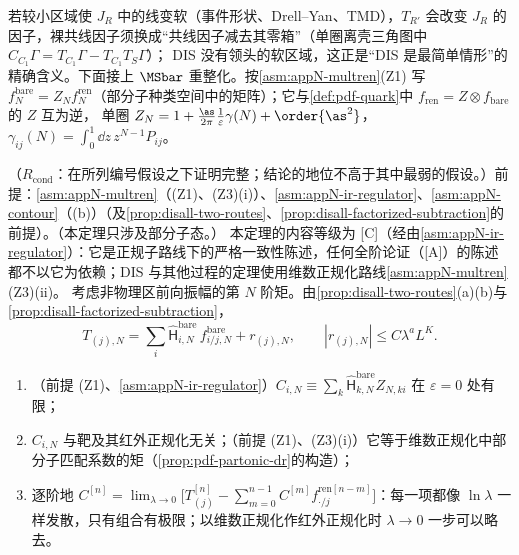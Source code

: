 \noindent
若较小区域使 $J_R$ 中的线变软（事件形状、Drell--Yan、TMD），$T_{R'}$ 会改变 $J_R$ 的因子，裸共线因子须换成“共线因子减去其零箱”（单圈离壳三角图中 $C_{C_1}\Gamma=T_{C_1}\Gamma-T_{C_1}T_S\Gamma$）；
DIS 没有领头的软区域，这正是“DIS 是最简单情形”的精确含义。下面接上 $\MSbar$ 重整化。按\cref{asm:appN-multren}(Z1) 写 $f^{\mathrm{bare}}_N=Z_Nf^{\mathrm{ren}}_N$（部分子种类空间中的矩阵）；它与\cref{def:pdf-quark}中 $f_{\mathrm{ren}}=Z\otimes f_{\mathrm{bare}}$ 的 $Z$ 互为逆，
单圈 $Z_N=1+\frac{\as}{2\pi}\frac1\varepsilon\gamma(N)+\order{\as^2}$，$\gamma_{ij}(N)=\int_0^1\dd z\,z^{N-1}P_{ij}$。

\begin{theorem}\label{thm:disall-renorm-compat}
（$R_{\mathrm{cond}}$：在所列编号假设之下证明完整；结论的地位不高于其中最弱的假设。）前提：\cref{asm:appN-multren}（(Z1)、(Z3)(i)）、\cref{asm:appN-ir-regulator}、\cref{asm:appN-contour}（(b)）（及\cref{prop:disall-two-routes}、\cref{prop:disall-factorized-subtraction}的前提）。（本定理只涉及部分子态。）
本定理的内容等级为 [C]（经由\cref{asm:appN-ir-regulator}）：它是正规子路线下的严格一致性陈述，任何全阶论证（[A]）的陈述都不以它为依赖；DIS 与其他过程的定理使用维数正规化路线\cref{asm:appN-multren}(Z3)(ii)。
考虑非物理区前向振幅的第 $N$ 阶矩。由\cref{prop:disall-two-routes}(a)(b)与\cref{prop:disall-factorized-subtraction}，
\begin{equation}\label{eq:disall-renorm-start}
T_{(j),N}=\sum_i\hat{\mathsf H}^{\mathrm{bare}}_{i,N}\,f^{\mathrm{bare}}_{i/j,N}+r_{(j),N},\qquad |r_{(j),N}|\le C\lambda^aL^K .
\end{equation}
\begin{enumerate}[label=(\alph*),leftmargin=2em,itemsep=1pt,topsep=2pt]
\item （前提 (Z1)、\cref{asm:appN-ir-regulator}）$C_{i,N}\equiv\sum_k\hat{\mathsf H}^{\mathrm{bare}}_{k,N}Z_{N,ki}$ 在 $\varepsilon=0$ 处有限；
\item $C_{i,N}$ 与靶及其红外正规化无关；（前提 (Z1)、(Z3)(i)）它等于维数正规化中部分子匹配系数的矩（\cref{prop:pdf-partonic-dr}的构造）；
\item 逐阶地 $C^{[n]}=\lim_{\lambda\to0}\big[T^{[n]}_{(j)}-\sum_{m=0}^{n-1}C^{[m]}f^{\mathrm{ren}[n-m]}_{\cdot/j}\big]$：每一项都像 $\ln\lambda$ 一样发散，只有组合有极限；以维数正规化作红外正规化时 $\lambda\to0$ 一步可以略去。
\end{enumerate}
\end{theorem}

